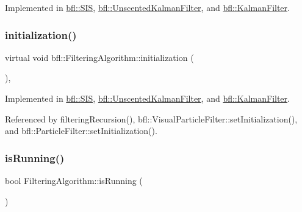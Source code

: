Implemented in \mbox{\hyperlink{classbfl_1_1SIS_a059da4c932379643ff7005fe4d0fda89}{bfl\+::\+S\+IS}}, \mbox{\hyperlink{classbfl_1_1UnscentedKalmanFilter_ad25c4f9143bbe834b3adfc81c78b6743}{bfl\+::\+Unscented\+Kalman\+Filter}}, and \mbox{\hyperlink{classbfl_1_1KalmanFilter_a24484fb845495f43628db19062937548}{bfl\+::\+Kalman\+Filter}}.

\mbox{\label{classbfl_1_1FilteringAlgorithm_af2a072aa51407fe5544bdbb7ce466e2a}} 
\subsubsection{\texorpdfstring{initialization()}{initialization()}}
{\footnotesize\ttfamily virtual void bfl\+::\+Filtering\+Algorithm\+::initialization (\begin{DoxyParamCaption}{ }\end{DoxyParamCaption})\hspace{0.3cm}{\ttfamily [protected]}, {}}



Implemented in \mbox{\hyperlink{classbfl_1_1SIS_aaf9f4a14d51804eddcd93aa8a5ccbba8}{bfl\+::\+S\+IS}}, \mbox{\hyperlink{classbfl_1_1UnscentedKalmanFilter_acd5cfc6344d9ce24fb980aa22ecf4895}{bfl\+::\+Unscented\+Kalman\+Filter}}, and \mbox{\hyperlink{classbfl_1_1KalmanFilter_a34482fcfad20be0559cea9c060c5f949}{bfl\+::\+Kalman\+Filter}}.



Referenced by filtering\+Recursion(), bfl\+::\+Visual\+Particle\+Filter\+::set\+Initialization(), and bfl\+::\+Particle\+Filter\+::set\+Initialization().

\mbox{\label{classbfl_1_1FilteringAlgorithm_a5cfecab2c778620e2557237472bb1721}} 
\subsubsection{\texorpdfstring{is\+Running()}{isRunning()}}
{\footnotesize\ttfamily bool Filtering\+Algorithm\+::is\+Running (\begin{DoxyParamCaption}{ }\end{DoxyParamCaption})}



